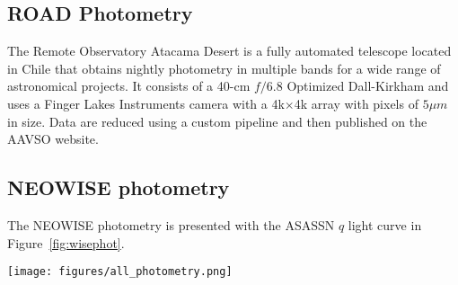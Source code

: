 \documentclass{aa}
\begin{document}

%
%
%
%

\subsection{ROAD Photometry}

The Remote Observatory Atacama Desert \citep[ROAD; ][]{Hambsch12} is a fully automated telescope located in Chile that obtains nightly photometry in multiple bands for a wide range of astronomical projects.
%
It consists of a 40-cm $f/6.8$ Optimized Dall-Kirkham and uses a Finger Lakes Instruments camera with a 4k$\times$4k array with pixels of $5\mu m$ in size.
%
Data are reduced using a custom pipeline and then published on the AAVSO website.

\subsection{NEOWISE photometry}

The NEOWISE photometry is presented with the ASASSN $q$ light curve in Figure~\ref{fig:wisephot}.

\begin{figure*}
\begin{centering}
\texttt{[image: figures/all\_photometry.png]}
\caption{NEOWISE $W1$ and $W2$ photometry of the star, with the WISE color in the lowest panel.
%
The $NEOWISE$ color changes from colourless to very red, which now fades back towards colourless over $\sim 500$ days.
}
\label{fig:wisephot}
\end{centering}
\end{figure*}
\end{document}
